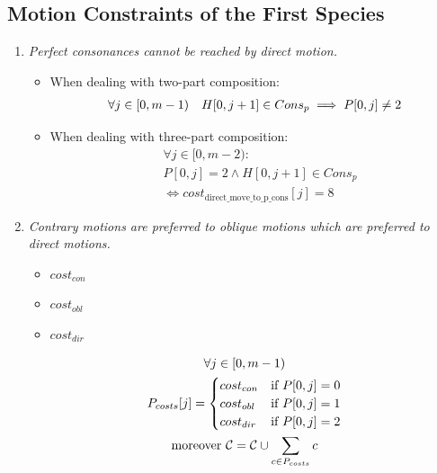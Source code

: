 \subsection*{Motion Constraints of the First Species}
\begin{enumerate}[wide, label=\bfseries 1.P\arabic*]

\item\label{rule:nopconsbydm}{ \textit{Perfect consonances cannot be reached by direct motion.}}

\begin{itemize} \item  When dealing with two-part composition:\begin{equation}
    \begin{gathered}
        \forall j \in [0, m-1)\quad
        H[0, j+1] \in Cons_{p} \implies P[0, j] \neq 2
    \end{gathered}
\end{equation}

\item When dealing with three-part composition:\begin{equation} \begin{aligned}
  &\forall j \in [0, m-2) :\\
  &P[0, j] = 2 \land H[0, j+1] \in Cons_{p} \\
  &\iff cost_{\text{{direct\_move\_to\_p\_cons}}}[j] = 8
\end{aligned} \end{equation}
\end{itemize}

\item\label{rule:codmotions} {\textit{Contrary motions are preferred to oblique motions which are preferred to direct motions.}}

\begin{multicols}{3}
    \begin{itemize}
        \item $cost_{con}$\\ 
        \item $cost_{obl}$\\ 
        \item $cost_{dir}$\\ 
    \end{itemize}
\end{multicols}

\begin{equation}
    \begin{gathered}
        \forall j \in [0, m-1)\\
        P_{costs}[j] = \begin{cases}
            cost_{con} & \text{if } P[0, j] = 0\\
            cost_{obl} & \text{if } P[0, j] = 1\\
            cost_{dir} & \text{if } P[0, j] = 2
        \end{cases}\\
        \text{moreover } \mathcal{C} = \mathcal{C} \cup \sum _{c \in P_{costs}} c
    \end{gathered}
\end{equation}


\end{enumerate}
